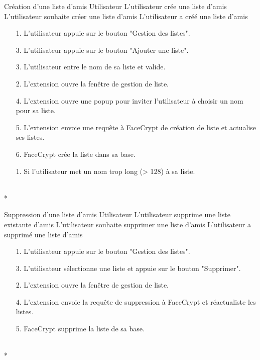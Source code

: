 \documentclass[a4paper,11pt,french]{article}
\begin{document}
\fiche
	{Création d'une liste d'amis}
	{Utilisateur}
    {L'utilisateur crée une liste d'amis}
    {}
    {L'utilisateur souhaite créer une liste d'amis}
	{L'utilisateur a créé une liste d'amis}
    {\begin{itemize}
        \item[]        
        \item[1.] L'utilisateur appuie sur le bouton "Gestion des listes".
        \item[3.] L'utilisateur appuie sur le bouton "Ajouter une liste".
        \item[3.] L'utilisateur entre le nom de sa liste et valide.
    \end{itemize}}
	{\begin{itemize}
        \item[]		
        \item[2.] L'extension ouvre la fenêtre de gestion de liste.
	\item[4.] L'extension ouvre une popup pour inviter l'utilisateur
    		à choisir un nom pour sa liste.
	\item[5.] L'extension envoie une requête à FaceCrypt de création de 
		liste et actualise ses listes.
	\item[6.] FaceCrypt crée la liste dans sa base.
	\end{itemize}
	}
	{}
\flots
    {\begin{itemize}
    \item[]
    \item[1.] Si l'utilisateur met un nom trop long (> 128) à sa liste.
    \end{itemize}
    }
    {}
\\*

\fiche
	{Suppression d'une liste d'amis}
	{Utilisateur}
    {L'utilisateur supprime une liste existante d'amis}
    {}
    {L'utilisateur souhaite supprimer une liste d'amis}
	{L'utilisateur a supprimé une liste d'amis}
    {\begin{itemize}
        \item[]
        \item[1.] L'utilisateur appuie sur le bouton "Gestion des listes".
        \item[3.] L'utilisateur sélectionne une liste et appuie sur le bouton
        "Supprimer".
    \end{itemize}}
	{\begin{itemize}
        \item[]
		\item[2.] L'extension ouvre la fenêtre de gestion de liste.
		\item[4.] L'extension envoie la requête de suppression à FaceCrypt
		et réactualiste les listes.
		\item[5.] FaceCrypt supprime la liste de sa base.
	\end{itemize}
	}
	{}
\flots
    {}
    {}
\\*
\end{document}
